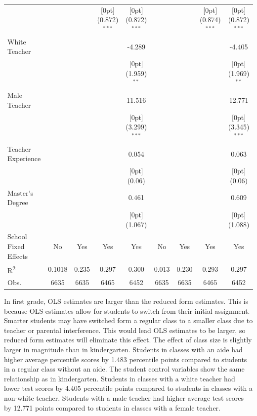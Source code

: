 \documentclass[a4paper,11pt]{article}
\begin{document}
\begin{table}[H]
\begin{tabular*}{\textwidth}{@{\extracolsep{\fill}}lcccccccc}
	&	&	&	\raisebox{.7ex}[0pt]{\scriptsize (0.872)$^{***}$} &	\raisebox{.7ex}[0pt]{\scriptsize (0.872)$^{***}$} 	&	&	&	\raisebox{.7ex}[0pt]{\scriptsize (0.874)$^{***}$} &	\raisebox{.7ex}[0pt]{\scriptsize (0.872)$^{***}$}\\
	White Teacher &	&	&	&	-4.289 &	&	&	&	-4.405\\
	&	&	&	&	\raisebox{.7ex}[0pt]{\scriptsize (1.959)$^{**}$} 	&	&	&	&	\raisebox{.7ex}[0pt]{\scriptsize (1.969)$^{**}$}\\
	Male Teacher &	&	&	&	11.516&	&	&	&	12.771  \\
	&	&	&	&	\raisebox{.7ex}[0pt]{\scriptsize (3.299)$^{***}$} 	&	&	&	&	\raisebox{.7ex}[0pt]{\scriptsize (3.345)$^{***}$}\\
	Teacher Experience &	&	&	&	0.054 &	&	&	&	0.063\\
	&	&	&	&	\raisebox{.7ex}[0pt]{\scriptsize (0.06)}&	&	&	&	\raisebox{.7ex}[0pt]{\scriptsize (0.06)} \\
	Master's Degree &	&	&	&	0.461&	&	&	&	0.609 \\
	&	&	&	&	\raisebox{.7ex}[0pt]{\scriptsize (1.067)} &	&	&	&	\raisebox{.7ex}[0pt]{\scriptsize (1.088)}\\
	School Fixed Effects &	No  & Yes &	Yes & Yes &	No & Yes &	Yes & Yes \\
	R\textsuperscript{2} & 0.1018 & 0.235 & 0.297 & 0.300 & 0.013 & 0.230 & 0.293 & 0.297 \\
	Obs. &	6635 &	6635 &	6465 &	6452  &	6635 &	6635 &	6465 &	6452\\
	\hline\hline				
\end{tabular*}
\end{table}
In first grade, OLS estimates are larger than the reduced form estimates. This is because OLS estimates allow for students to switch from their initial assignment. Smarter students may have switched form a regular class to a smaller class due to teacher or parental interference. This would lead OLS estimates to be larger, so reduced form estimates will eliminate this effect. The effect of class size is slightly larger in magnitude than in kindergarten. Students in classes with an aide had higher average percentile scores by 1.483 percentile points compared to students in a regular class without an aide. The student control variables show the same relationship as in kindergarten. Students in classes with a white teacher had lower test scores by 4.405 percentile points compared to students in classes with a non-white teacher. Students with a male teacher had higher average test scores by 12.771 points compared to students in classes with a female teacher. \par
\end{document}
